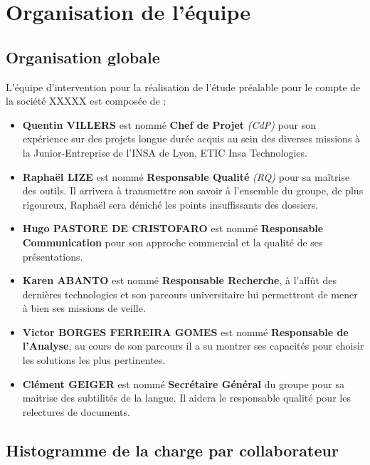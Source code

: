 \section{Organisation de l'équipe}

\subsection{Organisation globale}

L'équipe d'intervention pour la réalisation de l'étude préalable pour le compte de la société XXXXX est composée de : 

\begin{itemize}
\item {\bf Quentin VILLERS} est nommé {\bf Chef de Projet} {\it (CdP)} pour son expérience sur des projets longue durée acquis au sein des diverses missions à la Junior-Entreprise de l'INSA de Lyon, ETIC Insa Technologies.
\item {\bf Raphaël LIZE} est nommé {\bf Responsable Qualité} {\it (RQ)} pour sa maîtrise des outils. Il arrivera à transmettre son savoir à l'ensemble du groupe, de plus rigoureux, Raphaël sera déniché les points insuffissants des dossiers. 
\item {\bf Hugo PASTORE DE CRISTOFARO} est nommé {\bf Responsable Communication} pour son approche commercial et la qualité de ses présentations. 
\item {\bf Karen ABANTO} est nommé {\bf Responsable Recherche}, à l'affût des dernières technologies et son parcours universitaire lui permettront de mener à bien ses missions de veille.
\item {\bf Victor BORGES FERREIRA GOMES} est nommé {\bf Responsable de l'Analyse}, au cours de son parcours il a su montrer ses capacités pour choisir les solutions les plus pertinentes.
\item {\bf Clément GEIGER} est nommé {\bf Secrétaire Général} du groupe pour sa maitrise des subtilités de la langue. Il aidera le responsable qualité pour les relectures de documents.  
\end{itemize}

\subsection{Histogramme de la charge par collaborateur}

